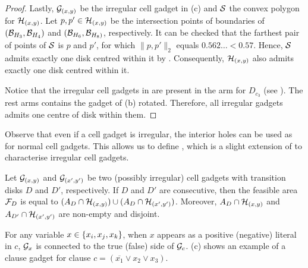 \begin{toappendix}
\begin{toappendix}
\begin{proof}
    Lastly, $\G_{(x,y)}$ be the irregular cell gadget in (c) and $\S$ the convex polygon for $\H_{(x,y)}$.
    Let $p,p' \in \H_{(x,y)}$ be the intersection points of boundaries of $(\B_{H_3},\B_{H_{4}})$ and $(\B_{H_6},\B_{H_8)}$, respectively.
    It can be checked that the farthest pair of points of $\S$ is $p$ and $p'$, for which $\lVert p,p'\rVert_2$ equals $0.562\ldots < 0.57$.
    Hence, $\S$ admits exactly one disk centred within it by .
    Consequently, $\H_{(x,y)}$ also admits exactly one disk centred within it.

    Notice that the irregular cell gadgets in  are present in the arm for $D_{c_3}$ (see ).
    The rest arms contains the gadget of (b) rotated.
    Therefore, all irregular gadgets admits one centre of disk within them.
\end{proof}

Observe that even if a cell gadget is irregular, the interior holes can be used as for normal cell gadgets.
This allows us to define , which is a slight extension of  to characterise irregular cell gadgets.

\begin{corollary}\label{cor:cg_two_subsets}
    Let $\G_{(x,y)}$ and $\G_{(x',y')}$ be two (possibly irregular) cell gadgets with transition disks $D$ and $D'$, respectively.
    If $D$ and $D'$ are consecutive, then the feasible area $\F_{D}$ is equal to $(A_D \cap \H_{(x,y)}) \cup (A_{D} \cap \H_{(x',y')})$.
    Moreover, $A_D \cap \H_{(x,y)}$ and $A_{D'} \cap \H_{(x',y')}$ are non-empty and disjoint.
\end{corollary}

For any variable $x \in \set{x_i,x_j,x_k}$, when $x$ appears as a positive (negative) literal in $c$, $\G_{x}$ is connected to the true (false) side of $\G_c$.
(c) shows an example of a clause gadget for clause $c = (\overline{x_1} \lor x_2 \lor x_3)$.


\end{toappendix}
\end{toappendix}
